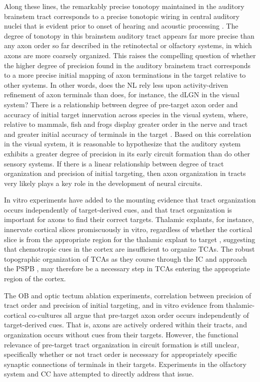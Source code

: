 Along these lines, the remarkably precise tonotopy maintained in the auditory brainstem tract \cite{kashima2013pre} corresponds to a precise tonotopic wiring in central auditory nuclei that is evident prior to onset of hearing and acoustic processing \cite{appler2011connecting}.
The degree of tonotopy in this brainstem auditory tract appears far more precise than any axon order so far described in the retinotectal or olfactory systems, in which axons are more coarsely organized.
This raises the compelling question of whether the higher degree of precision found in the auditory brainstem tract corresponds to a more precise initial mapping of axon terminations in the target relative to other systems.
In other words, does the NL rely less upon activity-driven refinement of axon terminals than does, for instance, the dLGN in the visual system? 
There is a relationship between degree of pre-target axon order and accuracy of initial target innervation across species in the visual system, where, relative to mammals, fish and frogs display greater order in the nerve and tract and greater initial accuracy of terminals in the target \cite{simon1991relationship}.
Based on this correlation in the visual system, it is reasonable to hypothesize that the auditory system exhibits a greater degree of precision in its early circuit formation than do other sensory systems.
If there is a linear relationship between degree of tract organization and precision of initial targeting, then axon organization in tracts very likely plays a key role in the development of neural circuits.

In vitro experiments have added to the mounting evidence that tract organization occurs independently of target-derived cues, and that tract organization is important for axons to find their correct targets.
Thalamic explants, for instance, innervate cortical slices promiscuously in vitro, regardless of whether the cortical slice is from the appropriate region for the thalamic explant to target \cite{molnar1991lack}, suggesting that chemotropic cues in the cortex are insufficient to organize TCAs.
The robust topographic organization of TCAs as they course through the IC and approach the PSPB \cite{molnar1998mechanisms}, may therefore be a necessary step in TCAs entering the appropriate region of the cortex. 

The OB and optic tectum ablation experiments, correlation between precision of tract order and precision of initial targeting, and in vitro evidence from thalamic-cortical co-cultures all argue that pre-target axon order occurs independently of target-derived cues.
That is, axons are actively ordered within their tracts, and organization occurs without cues from their targets.
However, the functional relevance of pre-target tract organization in circuit formation is still unclear, specifically whether or not tract order is necessary for appropriately specific synaptic connections of terminals in their targets.
Experiments in the olfactory system and CC have attempted to directly address that issue.

